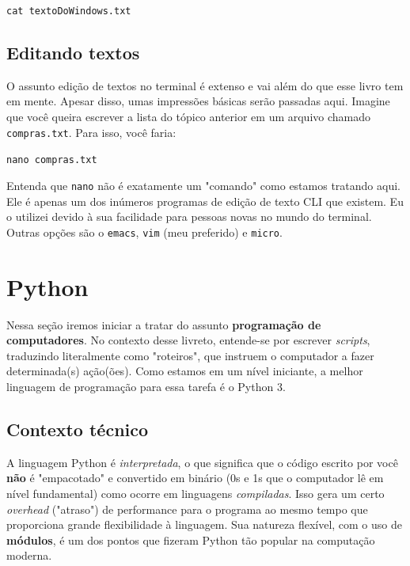 \documentclass{article}
\begin{document}
	\vspace{1ex}
	\texttt{cat textoDoWindows.txt} 
	\vspace{1ex} 

	\subsection{Editando textos} 

	O assunto edição de textos no terminal é extenso e vai além do que esse livro tem em mente. Apesar disso, umas impressões
	básicas serão passadas aqui. Imagine que você queira escrever a lista do tópico anterior em um arquivo chamado 
	\texttt{compras.txt}. Para isso, você faria: 
	
	\vspace{1ex} 
	\texttt{nano compras.txt} 
	\vspace{1ex}

	Entenda que \texttt{nano} não é exatamente um "comando" como estamos tratando aqui. Ele é apenas um dos inúmeros 
	programas de edição de texto CLI que existem. Eu o utilizei devido à sua facilidade para pessoas novas no mundo 
	do terminal. Outras opções são o \texttt{emacs}, \texttt{vim} (meu preferido) e \texttt{micro}. 

	\section{Python} 

	Nessa seção iremos iniciar a tratar do assunto \textbf{programação de computadores}. No contexto desse livreto, 
	entende-se por escrever \textit{scripts}, traduzindo literalmente como "roteiros", que instruem o computador a fazer
	determinada(s) ação(ões). Como estamos em um nível iniciante, a melhor linguagem de programação para essa tarefa 
	é o Python 3. 

	\subsection{Contexto técnico} 

	A linguagem Python é \textit{interpretada}, o que significa que o código escrito por você \textbf{não} é "empacotado" e
	convertido em binário (0s e 1s que o computador lê em nível fundamental) como ocorre em linguagens \textit{compiladas}. 
	Isso gera um certo \textit{overhead} ("atraso") de performance para o programa ao mesmo tempo que proporciona grande 
	flexibilidade à linguagem. Sua natureza flexível, com o uso de \textbf{módulos}, é um dos pontos que fizeram Python 
	tão popular na computação moderna. 
\end{document}

